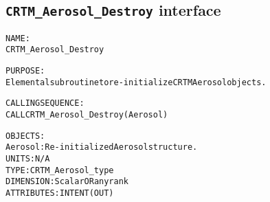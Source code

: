 \subsection{\texttt{CRTM\_Aerosol\_Destroy} interface}
  \label{sec:CRTM_Aerosol_Destroy_interface}
  \begin{alltt}
 
  NAME:
        CRTM_Aerosol_Destroy
  
  PURPOSE:
        Elemental subroutine to re-initialize CRTM Aerosol objects.
 
  CALLING SEQUENCE:
        CALL CRTM_Aerosol_Destroy( Aerosol )
 
  OBJECTS:
        Aerosol:      Re-initialized Aerosol structure.
                      UNITS:      N/A
                      TYPE:       CRTM_Aerosol_type
                      DIMENSION:  Scalar OR any rank
                      ATTRIBUTES: INTENT(OUT)
 
  \end{alltt}
